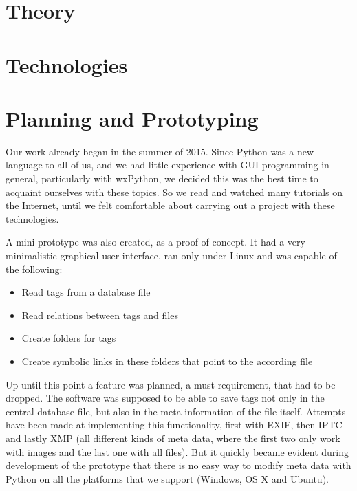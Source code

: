 \section{Theory}
\def\kapitelautor{Christoph Führer}

\section{Technologies}
\def\kapitelautor{Christoph Führer}

\section{Planning and Prototyping} %
\def\kapitelautor{Erik Ritschl}

Our work already began in the summer of 2015. Since Python was a new language
to all of us, and we had little experience with GUI programming in general,
particularly with wxPython, we decided this was the best time to acquaint
ourselves with these topics. So we read and watched many tutorials on the
Internet, until we felt comfortable about carrying out a project with these
technologies.

A mini-prototype was also created, as a proof of concept. It had a very
minimalistic graphical user interface, ran only under Linux and was capable of
the following:

\begin{itemize}
	\item Read tags from a database file
	\item Read relations between tags and files
	\item Create folders for tags
	\item Create symbolic links in these folders that point to the according file
\end{itemize}

Up until this point a feature was planned, a must-requirement, that had to be
dropped. The software was supposed to be able to save tags not only in the
central database file, but also in the meta information of the file itself.
Attempts have been made at implementing this functionality, first with EXIF,
then IPTC and lastly XMP (all different kinds of meta data, where the first two
only work with images and the last one with all files). But it quickly became
evident during development of the prototype that there is no easy way to modify
meta data with Python on all the platforms that we support (Windows, OS X and
Ubuntu).


